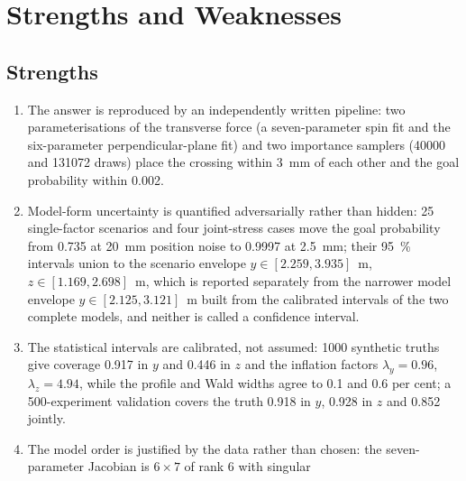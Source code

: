 \section{Strengths and Weaknesses}
\label{sec:strengths}

\subsection*{Strengths}

\begin{enumerate}[label=S\arabic*,font=\bfseries,leftmargin=*,itemsep=3pt]
  \item The answer is reproduced by an independently written pipeline: two
        parameterisations of the transverse force (a seven-parameter spin
        fit and the six-parameter perpendicular-plane fit) and two importance
        samplers (\num{40000} and \num{131072} draws) place the crossing within
        \SI{3}{mm} of each other and the goal probability within
        \num{0.002}.
  \item Model-form uncertainty is quantified adversarially rather than hidden:
        \num{25} single-factor scenarios and four joint-stress cases move the goal
        probability from \num{0.735} at \SI{20}{mm} position noise to \num{0.9997}
        at \SI{2.5}{mm}; their \SI{95}{\percent} intervals union to the scenario
        envelope $y\in[2.259,3.935]$~m, $z\in[1.169,2.698]$~m, which is reported
        separately from the narrower model envelope $y\in[2.125,3.121]$~m built
        from the calibrated intervals of the two complete models, and neither is
        called a confidence interval.
  \item The statistical intervals are calibrated, not assumed: \num{1000}
        synthetic truths give coverage \num{0.917} in $y$ and \num{0.446} in
        $z$ and the inflation factors $\lambda_y=0.96$, $\lambda_z=4.94$,
        while the profile and Wald widths agree to \num{0.1} and \num{0.6} per
        cent; a \num{500}-experiment validation covers the truth \num{0.918}
        in $y$, \num{0.928} in $z$ and \num{0.852} jointly.
  \item The model order is justified by the data rather than chosen: the
        seven-parameter Jacobian is $6\times7$ of rank \num{6} with singular

\end{enumerate}
